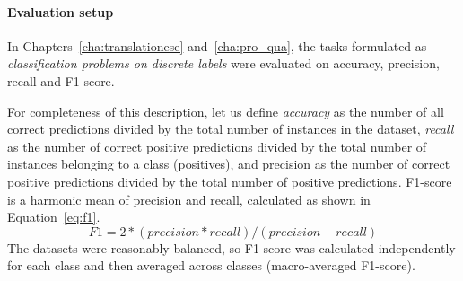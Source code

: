 \paragraph{\label{pg:eval_setup}Evaluation setup} 
In Chapters~\ref{cha:translationese} and~\ref{cha:pro_qua}, the tasks formulated as \textit{classification problems on discrete labels} were evaluated on accuracy, precision, recall and F1-score.

For completeness of this description, let us define \textit{accuracy} as the number of all correct predictions divided by the total number of instances in the dataset, \textit{recall} %
as the number of correct positive predictions divided by the total number of instances belonging to a class (positives), and precision %
as the number of correct positive predictions divided by the total number of positive predictions.
F1-score is a harmonic mean of precision and recall, calculated as shown in Equation~\ref{eq:f1}. %
\begin{equation}\label{eq:f1}
	F1 = 2 * (precision * recall) / (precision + recall)
\end{equation}
The datasets were reasonably balanced, so F1-score was calculated independently for each class and then averaged across classes (macro-averaged F1-score). %



